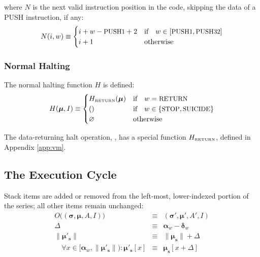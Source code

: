 \documentclass[9pt,oneside]{amsart}
\begin{document}
\begin{multicols}{2}
where $N$ is the next valid instruction position in the code, skipping the data of a {\small PUSH} instruction, if any:
\begin{equation}
N(i, w) \equiv \begin{cases}
i + w - \text{\small PUSH1} + 2 & \text{if} \quad w \in [\text{\small PUSH1}, \text{\small PUSH32}] \\
i + 1 & \text{otherwise} \end{cases}
\end{equation}

\subsubsection{Normal Halting}

The normal halting function $H$ is defined:
\begin{equation}
H(\boldsymbol{\mu}, I) \equiv \begin{cases}
H_{\text{\tiny RETURN}}(\boldsymbol{\mu}) & \text{if} \quad w = \text{\small RETURN} \\
() & \text{if} \quad w \in \{ \text{\small STOP}, \text{\small SUICIDE} \} \\
\varnothing & \text{otherwise}
\end{cases}
\end{equation}

The data-returning halt operation, , has a special function $H_{\text{\tiny RETURN}}$, defined in Appendix \ref{app:vm}.

\subsection{The Execution Cycle}

Stack items are added or removed from the left-most, lower-indexed portion of the series; all other items remain unchanged:
\begin{eqnarray}
O\big((\boldsymbol{\sigma}, \boldsymbol{\mu}, A, I)\big) & \equiv & (\boldsymbol{\sigma}', \boldsymbol{\mu}', A', I) \\
\Delta & \equiv & \mathbf{\alpha}_w - \mathbf{\delta}_w \\
\lVert\boldsymbol{\mu}'_\mathbf{s}\rVert & \equiv & \lVert\boldsymbol{\mu}_\mathbf{s}\rVert + \Delta \\
\quad \forall x \in [\mathbf{\alpha}_w, \lVert\boldsymbol{\mu}'_\mathbf{s}\rVert): \boldsymbol{\mu}'_\mathbf{s}[x] & \equiv & \boldsymbol{\mu}_\mathbf{s}[x+\Delta]
\end{eqnarray}


\end{multicols}
\end{document}
